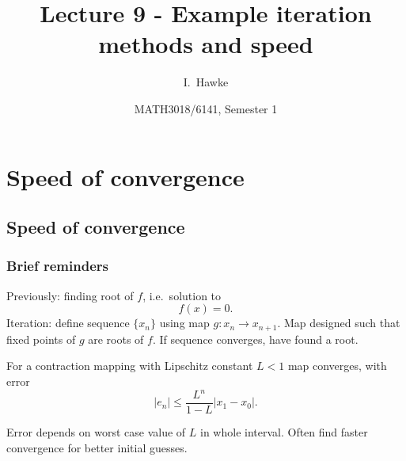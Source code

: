 \documentclass{beamer}
\title[Lecture 9] %
{Lecture 9 - Example iteration methods and speed}
\author[I. Hawke] %
{I.~Hawke}
\institute[University of Southampton] %
{
  School of Mathematics, \\
  University of Southampton, UK
}
\date[Semester 1] %
{MATH3018/6141, Semester 1}
\begin{document}
\begin{frame}
  \titlepage
\end{frame}


\section{Speed of convergence}

\subsection{Speed of convergence}

\begin{frame}
  \frametitle{Brief reminders}

  Previously: finding root of $f$, i.e.\ solution to
  \begin{equation*}
    f(x) = 0.
  \end{equation*}
  Iteration: define sequence $\{x_n\}$ using map $g : x_n
  \rightarrow x_{n+1}$. Map designed such that fixed points of
  $g$ are roots of $f$. If sequence converges, have found a root. \pause

  \vspace{1ex}

  For a contraction mapping with Lipschitz constant $L < 1$ map converges, with error
  \begin{equation*}
    |e_n| \leq \frac{L^n}{1 - L} |x_1 - x_0|.
  \end{equation*} \pause

  \vspace{1ex}

  Error depends on worst case value of $L$ in whole interval. Often find faster convergence for better initial guesses.

\end{frame}
\end{document}
